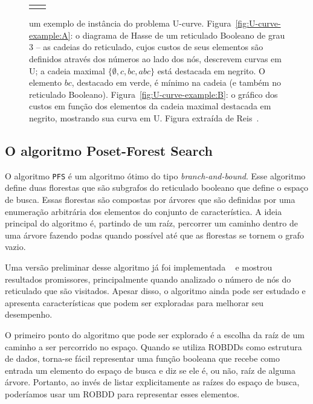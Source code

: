 \documentclass[12pt]{article}
\begin{document}
\begin{figure}[!ht]
\begin{tabular}{c c}
{        \label{fig:U-curve-example:B} 
    }
\end{tabular}
\caption{um exemplo de instância do problema U-curve. 
Figura~\ref{fig:U-curve-example:A}: o diagrama de Hasse de um reticulado
Booleano de grau $3$ -- as cadeias do reticulado, cujos custos de seus
elementos são definidos através dos números ao lado dos nós, descrevem
curvas em U; a cadeia maximal $\{ \emptyset, c, bc, abc \}$ está
destacada em negrito. O elemento $bc$, destacado em verde, é mínimo na
cadeia (e também no reticulado Booleano). 
Figura~\ref{fig:U-curve-example:B}: o gráfico dos custos em função dos
elementos da cadeia maximal destacada em negrito, mostrando sua curva em
U. Figura extraída de Reis~\cite{msreis thesis}.} 
    \label{fig:U-curve} 
\end{figure}


\subsection{O algoritmo Poset-Forest Search}
O algoritmo {\tt PFS} é um algoritmo ótimo do tipo 
{\em branch-and-bound}. Esse algoritmo define duas florestas que são 
subgrafos do reticulado booleano que define o espaço de busca. Essas
florestas são compostas por árvores que são definidas por uma enumeração
arbitrária dos elementos do conjunto de característica. A ideia 
principal do algoritmo é, partindo de um raíz, percorrer um caminho 
dentro de uma árvore fazendo podas quando possível até que as florestas
se tornem o grafo vazio.

Uma versão preliminar desse algoritmo já foi implementada 
~\cite{msreis thesis} e mostrou resultados promissores, principalmente
quando analizado o número de nós do reticulado que são visitados. Apesar
disso, o algoritmo ainda pode ser estudado e apresenta características
que podem ser exploradas para melhorar seu desempenho. 

O primeiro ponto do algoritmo que pode ser explorado é a escolha da raíz
de um caminho a ser percorrido no espaço. Quando se utiliza ROBDDs como 
estrutura de dados, torna-se fácil representar uma função booleana que
recebe como entrada um elemento do espaço de busca e diz se ele é, ou 
não, raíz de alguma árvore. Portanto, ao invés de listar explicitamente
as raízes do espaço de busca, poderíamos usar um ROBDD para representar
esses elementos.
\end{document}
